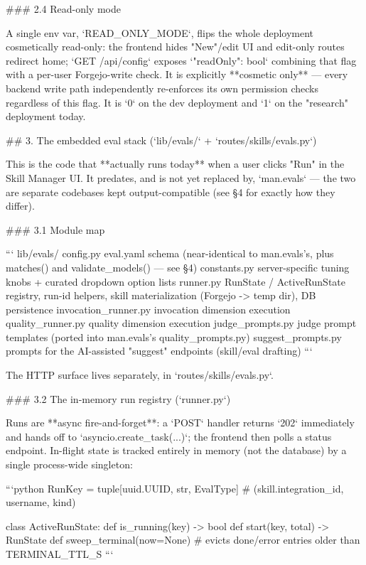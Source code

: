 ### 2.4 Read-only mode

A single env var, `READ_ONLY_MODE`, flips the whole deployment cosmetically read-only: the frontend hides "New"/edit UI and edit-only routes redirect home; `GET /api/config` exposes `{"readOnly": bool}` combining that flag with a per-user Forgejo-write check. It is explicitly **cosmetic only** — every backend write path independently re-enforces its own permission checks regardless of this flag. It is `0` on the dev deployment and `1` on the "research" deployment today.

## 3. The embedded eval stack (`lib/evals/` + `routes/skills/evals.py`)

This is the code that **actually runs today** when a user clicks "Run" in the Skill Manager UI. It predates, and is not yet replaced by, `man.evals` — the two are separate codebases kept output-compatible (see §4 for exactly how they differ).

### 3.1 Module map

```
lib/evals/
  config.py              eval.yaml schema (near-identical to man.evals's, plus matches()
                          and validate_models() — see §4)
  constants.py            server-specific tuning knobs + curated dropdown option lists
  runner.py               RunState / ActiveRunState registry, run-id helpers,
                           skill materialization (Forgejo -> temp dir), DB persistence
  invocation_runner.py     invocation dimension execution
  quality_runner.py        quality dimension execution
  judge_prompts.py         judge prompt templates (ported into man.evals's quality_prompts.py)
  suggest_prompts.py       prompts for the AI-assisted "suggest" endpoints (skill/eval drafting)
```

The HTTP surface lives separately, in `routes/skills/evals.py`.

### 3.2 The in-memory run registry (`runner.py`)

Runs are **async fire-and-forget**: a `POST` handler returns `202` immediately and hands off to `asyncio.create_task(...)`; the frontend then polls a status endpoint. In-flight state is tracked entirely in memory (not the database) by a single process-wide singleton:

```python
RunKey = tuple[uuid.UUID, str, EvalType]   # (skill.integration_id, username, kind)

class ActiveRunState:
    def is_running(key) -> bool
    def start(key, total) -> RunState
    def sweep_terminal(now=None)           # evicts done/error entries older than TERMINAL_TTL_S
```

